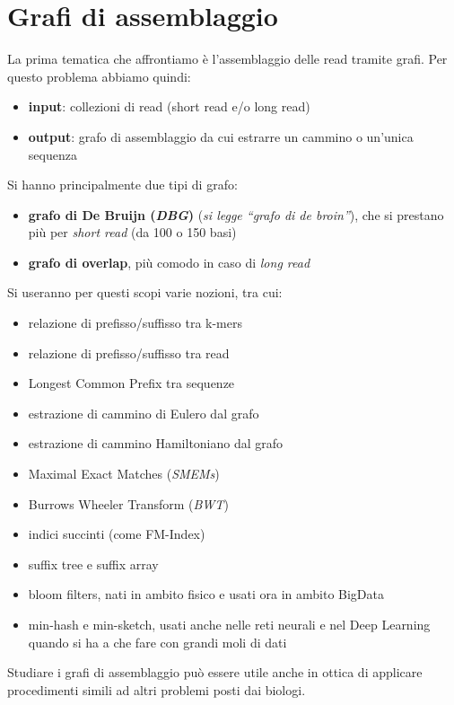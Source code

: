 \documentclass[a4paper,12pt, oneside]{book}
\begin{document}
\chapter{Grafi di assemblaggio}
La prima tematica che affrontiamo è l'assemblaggio delle read tramite grafi. Per
questo problema abbiamo quindi:
\begin{itemize}
  \item \textbf{input}: collezioni di read (short read e/o long read)
  \item \textbf{output}: grafo di assemblaggio da cui estrarre un cammino o
  un'unica sequenza
\end{itemize}
Si hanno principalmente due tipi di grafo:
\begin{itemize}
  \item \textbf{grafo di De Bruijn (\textit{DBG})} (\textit{si legge ``grafo di
    de broin''}), che si prestano più per \textit{short read} (da 100 o 150
  basi) 
  \item \textbf{grafo di overlap}, più comodo in caso di \textit{long read}
\end{itemize}
Si useranno per questi scopi varie nozioni, tra cui:
\begin{itemize}
  \item relazione di prefisso/suffisso tra k-mers
  \item relazione di prefisso/suffisso tra read
  \item Longest Common Prefix tra sequenze
  \item estrazione di cammino di Eulero dal grafo
  \item estrazione di cammino Hamiltoniano dal grafo
  \item Maximal Exact Matches (\textit{SMEMs})
  \item Burrows Wheeler Transform (\textit{BWT})
  \item indici succinti (come FM-Index)
  \item suffix tree e suffix array
  \item bloom filters, nati in ambito fisico e usati ora in ambito BigData
  \item min-hash e min-sketch, usati anche nelle reti neurali e nel Deep
  Learning quando si ha a che fare con grandi moli di dati
\end{itemize}
Studiare i grafi di assemblaggio può essere utile anche in ottica di applicare
procedimenti simili ad altri problemi posti dai biologi.
\end{document}
